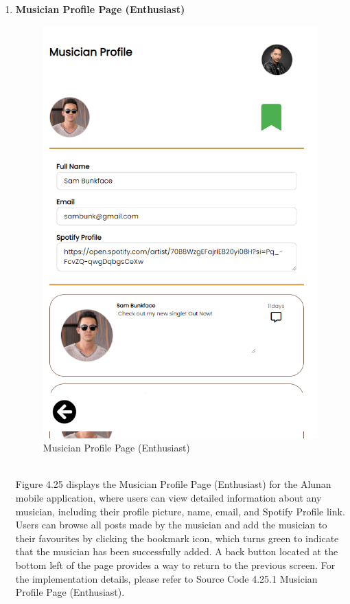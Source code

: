\begin{enumerate}[1.]
    \item \textbf{Musician Profile Page (Enthusiast)}
    \begin{figure}[h]
        \centering
        \includegraphics[width=0.5\linewidth]{mainmatter/images/frontend/ss/Musician Profile (Enthusiast).png}
        \caption{Musician Profile Page (Enthusiast)}
        \label{fig:myfig64}
    \end{figure} \\
    Figure 4.25 displays the Musician Profile Page (Enthusiast) for the Alunan mobile application, where users can view detailed information about any musician, including their profile picture, name, email, and Spotify Profile link. Users can browse all posts made by the musician and add the musician to their favourites by clicking the bookmark icon, which turns green to indicate that the musician has been successfully added. A back button located at the bottom left of the page provides a way to return to the previous screen. For the implementation details, please refer to Source Code 4.25.1 Musician Profile Page (Enthusiast).
    \clearpage
    \begin{figure}[h]\ContinuedFloat
        \centering
        \begin{subfigure}[b]{0.6\textwidth}
            \centering

\end{subfigure}
\end{figure}
\end{enumerate}

